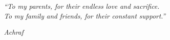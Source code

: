 
\vspace*{\fill}
\begin{center}
    \itshape
    ``To my parents, for their endless love and sacrifice.\\[8pt]
    To my family and friends, for their constant support.''
\end{center}

\medskip
\begin{flushright}
    \itshape Achraf
\end{flushright}
\vspace*{\fill}
\clearpage
